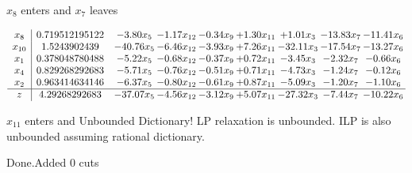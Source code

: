 \documentclass[8pt]{article}
\begin{document}
 $ x_{8} $ enters and $ x_{7} $ leaves 

 \[\begin{array}{c| c c@{\hskip 2pt} c@{\hskip 2pt} c@{\hskip 2pt} c@{\hskip 2pt} c@{\hskip 2pt} c@{\hskip 2pt} c@{\hskip 2pt} }
 x_{8}   &  0.719512195122 & -3.80 x_{5} & -1.17 x_{12} & -0.34 x_{9} & +  1.30 x_{11} & +  1.01 x_{3} & -13.83 x_{7} & -11.41 x_{6}\\
 x_{10}   &  1.5243902439 & -40.76 x_{5} & -6.46 x_{12} & -3.93 x_{9} & +  7.26 x_{11} & -32.11 x_{3} & -17.54 x_{7} & -13.27 x_{6}\\
 x_{1}   &  0.378048780488 & -5.22 x_{5} & -0.68 x_{12} & -0.37 x_{9} & +  0.72 x_{11} & -3.45 x_{3} & -2.32 x_{7} & -0.66 x_{6}\\
 x_{4}   &  0.829268292683 & -5.71 x_{5} & -0.76 x_{12} & -0.51 x_{9} & +  0.71 x_{11} & -4.73 x_{3} & -1.24 x_{7} & -0.12 x_{6}\\
 x_{2}   &  0.963414634146 & -6.37 x_{5} & -0.80 x_{12} & -0.61 x_{9} & +  0.87 x_{11} & -5.09 x_{3} & -1.20 x_{7} & -1.10 x_{6}\\
\hline
z    &  4.29268292683 & -37.07 x_{5} & -4.56 x_{12} & -3.12 x_{9} & +  5.07 x_{11} & -27.32 x_{3} & -7.44 x_{7} & -10.22 x_{6}\\
\end{array}\]


 $ x_{11} $ enters and Unbounded Dictionary!
 LP relaxation is unbounded. ILP is also unbounded assuming rational dictionary. 

Done.Added 0 cuts 
\end{document}
